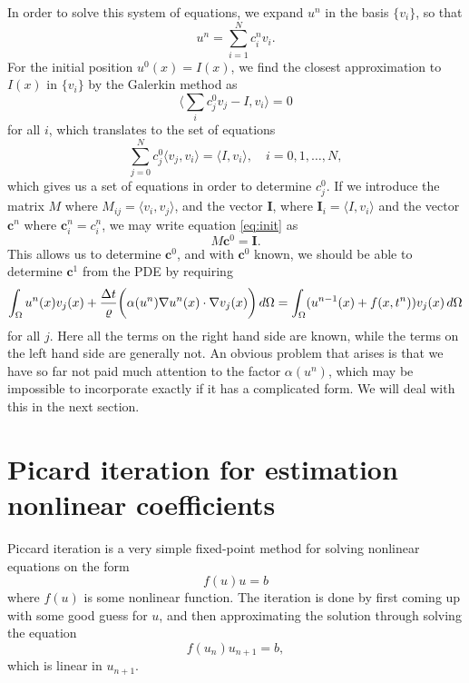 \documentclass[12pt]{article}
\begin{document}
In order to solve this system of equations, we expand $u^n$ in the basis $\{v_i\}$, so that 
\begin{equation}
 u^n = \sum_{i=1}^N c_i^n v_i.
\end{equation}
For the initial position $u^0(x) = I(x)$, we find the closest approximation to $I(x)$ in $\{v_i\}$ by the Galerkin method as 
\begin{equation}
\bigg\langle \sum_i c_j^0 v_j - I, v_i \bigg\rangle = 0  
\end{equation}
for all $i$, which translates to the set of equations 
\begin{equation}\label{eq:init}
 \sum_{j=0}^N c_j^0\langle v_j, v_i \rangle = \langle I , v_i \rangle, \quad i = 0,1,\dots,N,
\end{equation}
which gives us a set of equations in order to determine $c_j^0$. If we introduce the matrix $M$ where $M_{ij} = \langle v_i, v_j \rangle$, and the vector $\textbf{I}$, where $\textbf{I}_i = \langle I , v_i \rangle$ and the vector $\textbf{c}^n$ where $\textbf{c}^n_i = c^n_i$, we may write equation \eqref{eq:init} as 
\begin{equation}
 M \textbf{c}^0 = \textbf{I}. 
\end{equation}
This allows us to determine $\textbf{c}^0$, and with $\textbf{c}^0$ known, we should be able to determine $\textbf{c}^1$ from the PDE by requiring
 \begin{equation}\label{eq:inteq}
 \int_\Omega  u^n(x)v_j(x) + {\Delta t \over \varrho}\bigg( \alpha(u^n) \nabla u^n(x)\cdot \nabla v_j(x) \bigg)\, d\Omega = \int_\Omega (u^{n-1}(x) + f(x,t^n)) v_j(x) \, d\Omega
\end{equation}
for all $j$. Here all the terms on the right hand side are known, while the terms on the left hand side are generally not. An obvious problem that arises is that we have so far not paid much attention to the factor $\alpha(u^n)$, which may be impossible to incorporate exactly if it has a complicated form. We will deal with this in the next section. 

\section{Picard iteration for estimation nonlinear coefficients}
Piccard iteration is a very simple fixed-point method for solving nonlinear equations on the form 
\begin{equation}
 f(u)u = b
\end{equation}
where $f(u)$ is some nonlinear function. The iteration is done by first coming up with some good guess for $u$, and then approximating the solution through solving the equation
\begin{equation}
 f(u_n)u_{n+1} = b,
\end{equation}
which is linear in $u_{n+1}$. 
\end{document}
